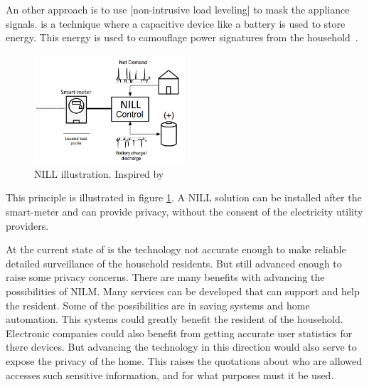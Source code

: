 An other approach is to use [non-intrusive load leveling] to mask the appliance signals.  is a technique where a capacitive device like a battery is used to store energy. This energy is used to camouflage power signatures from the household~\citep{RefWorks:36}. 

\begin{figure}[H]
\centering
\includegraphics[width=0.5\textwidth]{billeder/NILLILU.png}
\caption{NILL illustration. Inspired by \citep{RefWorks:36}}
\label{fig:NILL}
\end{figure}

This principle is illustrated in figure \ref{fig:NILL}. A NILL solution can be installed after the smart-meter and can provide privacy, without the consent of the electricity utility providers.

At the current state of  is the technology not accurate enough to make reliable detailed surveillance of the household residents. But still advanced enough to raise some privacy concerns. There are many benefits with advancing the possibilities of NILM. Many services can be developed that can support and help the resident. Some of the possibilities are in saving systems and home automation. This systems could greatly benefit the resident of the household. Electronic companies could also benefit from getting accurate user statistics for there devices. But advancing the technology in this direction would also serve to expose the privacy of the home. This raises the quotations about who are allowed accesses such sensitive information, and for what purposes must it be used. 